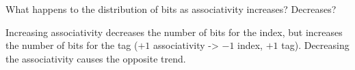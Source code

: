 \begin{blocksection}
\question
What happens to the distribution of bits as associativity increases? Decreases?

\begin{solution}[0.5in]
Increasing associativity decreases the number of bits for the index, but increases the number of bits for the tag ($+1$ associativity -> $-1$ index, $+1$ tag). Decreasing the associativity causes the opposite trend.
\end{solution}
\end{blocksection}